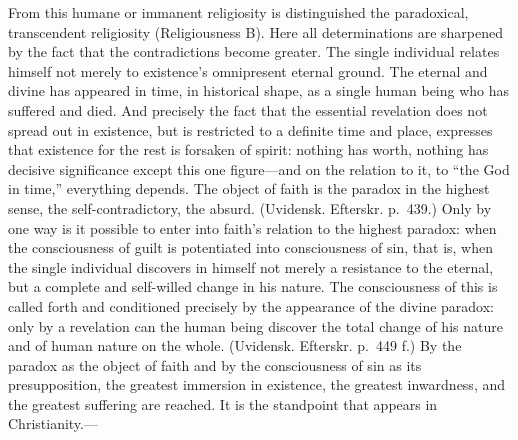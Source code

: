 \documentclass[12pt,a4paper]{book}
\newcommand{\opage}[1]{\marginnote{\footnotesize\textit{[#1]}}}
\begin{document}
From this humane or immanent religiosity is distinguished the paradoxical,
transcendent religiosity (Religiousness B). Here all determinations are
sharpened by the fact that the contradictions become greater. The single
individual relates himself not merely to existence's omnipresent eternal
ground. The eternal and divine has appeared in time, in historical
\opage{118}shape, as a single human being who has suffered and died. And
precisely the fact that the essential revelation does not spread out in
existence, but is restricted to a definite time and place, expresses that
existence for the rest is forsaken of spirit: nothing has worth, nothing
has decisive significance except this one figure---and on the relation to
it, to ``the God in time,'' everything depends. The object of faith is the
paradox in the highest sense, the self-contradictory, the absurd.
(Uvidensk. Efterskr. p.~439.) Only by one way is it possible to enter into
faith's relation to the highest paradox: when the consciousness of guilt
is potentiated into consciousness of sin, that is, when the single
individual discovers in himself not merely a resistance to the eternal,
but a complete and self-willed change in his nature. The consciousness of
this is called forth and conditioned precisely by the appearance of the
divine paradox: only by a revelation can the human being discover the
total change of his nature and of human nature on the whole. (Uvidensk.
Efterskr. p.~449 f.) By the paradox as the object of faith and by the
consciousness of sin as its presupposition, the greatest immersion in
existence, the greatest inwardness, and the greatest suffering are
reached. It is the standpoint that appears in Christianity.---
\end{document}
